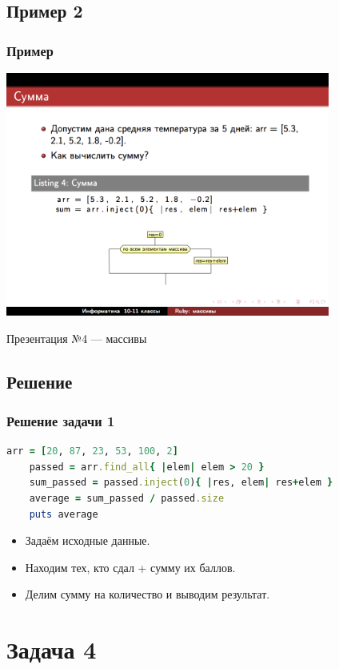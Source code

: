 \documentclass[compress,red]{beamer}
\begin{document}
\subsection{Пример 2}
\begin{frame}[fragile]
  \frametitle{Пример}
  \centerline{\includegraphics[width=0.8\textwidth]{images/screen2.png}}
  \centerline{Презентация №4 --- массивы}
\end{frame}

\subsection{Решение}
\begin{frame}[fragile]
  \frametitle{Решение задачи 1}
  \scriptsize{
  \begin{lstlisting}[language=ruby,basicstyle=\footnotesize,label=ruby1,caption=Решение задачи 1]
    arr = [20, 87, 23, 53, 100, 2]
    passed = arr.find_all{ |elem| elem > 20 }
    sum_passed = passed.inject(0){ |res, elem| res+elem }
    average = sum_passed / passed.size
    puts average
  \end{lstlisting}
  }
  \begin{itemize}
    \item Задаём исходные данные.
    \item Находим тех, кто сдал + сумму их баллов.
    \item Делим сумму на количество и выводим результат.
  \end{itemize}
\end{frame}

\section{Задача 4}
\end{document}
